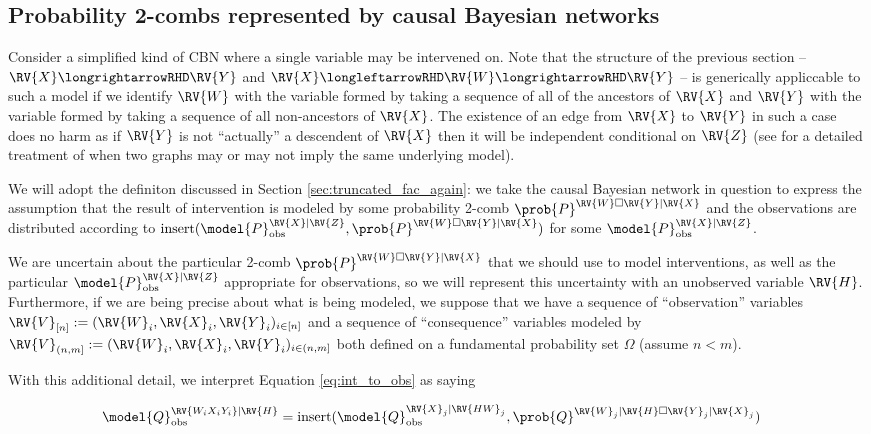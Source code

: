 \subsection{Probability 2-combs represented by causal Bayesian networks}

Consider a simplified kind of CBN where a single variable may be intervened on. Note that the structure of the previous section -- $\RV{X}\longrightarrowRHD \RV{Y}$ and $\RV{X}\longleftarrowRHD \RV{W} \longrightarrowRHD \RV{Y}$ -- is generically appliccable to such a model if we identify $\RV{W}$ with the variable formed by taking a sequence of all of the ancestors of $\RV{X}$ and $\RV{Y}$ with the variable formed by taking a sequence of all non-ancestors of $\RV{X}$. The existence of an edge from $\RV{X}$ to $\RV{Y}$ in such a case does no harm as if $\RV{Y}$ is not ``actually'' a descendent of $\RV{X}$ then it will be independent conditional on $\RV{Z}$ (see \citet{peters_structural_2015} for a detailed treatment of when two graphs may or may not imply the same underlying model).

We will adopt the definiton discussed in Section \ref{sec:truncated_fac_again}: we take the causal Bayesian network in question to express the assumption that the result of intervention is modeled by some probability 2-comb $\prob{P}^{\RV{W}\square \RV{Y}|\RV{X}}$ and the observations are distributed according to $\text{insert}(\model{P}_{\text{obs}}^{\RV{X}|\RV{Z}},\prob{P}^{\RV{W}\square\RV{Y}|\RV{X}})$ for some $\model{P}_{\text{obs}}^{\RV{X}|\RV{Z}}$.

We are uncertain about the particular 2-comb $\prob{P}^{\RV{W}\square \RV{Y}|\RV{X}}$ that we should use to model interventions, as well as the particular $\model{P}_{\text{obs}}^{\RV{X}|\RV{Z}}$ appropriate for observations, so we will represent this uncertainty with an unobserved variable $\RV{H}$. Furthermore, if we are being precise about what is being modeled, we suppose that we have a sequence of ``observation'' variables $\RV{V}_{[n]}:=(\RV{W}_i,\RV{X}_i,\RV{Y}_i)_{i\in [n]}$ and a sequence of ``consequence'' variables modeled by $\RV{V}_{(n,m]}:=(\RV{W}_i,\RV{X}_i,\RV{Y}_i)_{i\in (n,m]}$ both defined on a fundamental probability set $\Omega$ (assume $n<m$). 

With this additional detail, we interpret Equation \ref{eq:int_to_obs} as saying

\begin{align}
    \model{Q}_{\text{obs}}^{\RV{W_iX_iY_i}|\RV{H}} &= \text{insert}(\model{Q}_{\text{obs}}^{\RV{X}_{j}|\RV{HW}_{j}},\prob{Q}^{\RV{W}_{j}|\RV{H}\square\RV{Y}_{j}|\RV{X}_{j}})
\end{align}


